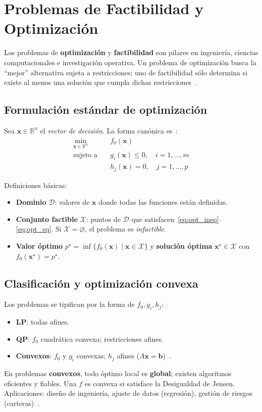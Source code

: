 \section{Problemas de Factibilidad y Optimización}
\label{sec:main_fact_opt}%

Los problemas de \textbf{optimización} y \textbf{factibilidad} son pilares en ingeniería, ciencias computacionales e investigación operativa. Un problema de optimización busca la “mejor” alternativa sujeta a restricciones; uno de factibilidad sólo determina si existe al menos una solución que cumpla dichas restricciones~\cite{BoydVandenberghe2004}.

\subsection{Formulación estándar de optimización}
\label{sec:opt_problems}%
Sea $\mathbf{x}\in\mathbb{R}^n$ el \emph{vector de decisión}. La forma canónica es~\cite{BoydVandenberghe2004}:
\begin{align}
  \min_{\mathbf{x}\in\mathbb{R}^n}\quad & f_0(\mathbf{x}) \label{eq:opt_obj}\\
  \text{sujeto a}\quad & g_i(\mathbf{x}) \le 0,\quad i=1,\dots,m \label{eq:opt_ineq}\\
                       & h_j(\mathbf{x}) = 0,\quad j=1,\dots,p \label{eq:opt_eq}
\end{align}

\noindent Definiciones básicas:
\begin{itemize}
  \item \textbf{Dominio} $\mathcal{D}$: valores de $\mathbf{x}$ donde todas las funciones están definidas.
  \item \textbf{Conjunto factible} $\mathcal{X}$: puntos de $\mathcal{D}$ que satisfacen~\eqref{eq:opt_ineq}–\eqref{eq:opt_eq}. Si $\mathcal{X}=\varnothing$, el problema es \emph{infactible}.
  \item \textbf{Valor óptimo} $p^\star=\inf\{f_0(\mathbf{x})\mid \mathbf{x}\in\mathcal{X}\}$ y \textbf{solución óptima} $\mathbf{x}^\star\in\mathcal{X}$ con $f_0(\mathbf{x}^\star)=p^\star$.
\end{itemize}

\subsection{Clasificación y optimización convexa}
Los problemas se tipifican por la forma de $f_0,g_i,h_j$:
\begin{itemize}
  \item \textbf{LP}: todas afines.
  \item \textbf{QP}: $f_0$ cuadrática convexa; restricciones afines.
  \item \textbf{Convexos}: $f_0$ y $g_i$ convexas; $h_j$ afines ($A\mathbf{x}=\mathbf{b}$)~\cite{BoydVandenberghe2004}.
\end{itemize}
En problemas \textbf{convexos}, todo óptimo local es \textbf{global}; existen algoritmos eficientes y fiables. Una $f$ es convexa si satisface la Desigualdad de Jensen. Aplicaciones: diseño de ingeniería, ajuste de datos (regresión), gestión de riesgos (carteras)~\cite{BoydVandenberghe2004}.

